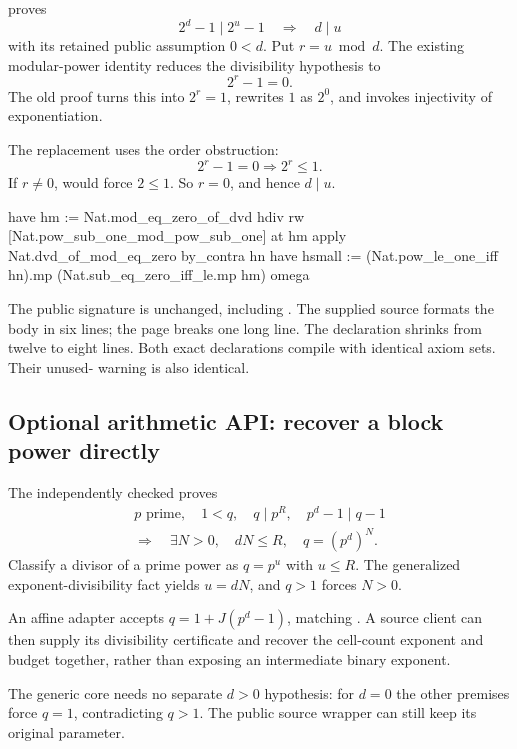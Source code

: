 proves
\[
      2^d-1\mid 2^u-1\quad\Longrightarrow\quad d\mid u
\]
with its retained public assumption $0<d$. Put $r=u\bmod d$. The existing
modular-power identity reduces the divisibility hypothesis to
\[
      2^r-1=0.
\]
The old proof turns this into $2^r=1$, rewrites $1$ as $2^0$, and invokes
injectivity of exponentiation.

The replacement uses the order obstruction:
\[
      2^r-1=0\Longrightarrow 2^r\le1.
\]
If $r\ne0$,  would force $2\le1$.
So $r=0$, and hence $d\mid u$.

\begin{Lean}
  have hm := Nat.mod_eq_zero_of_dvd hdiv
  rw [Nat.pow_sub_one_mod_pow_sub_one] at hm
  apply Nat.dvd_of_mod_eq_zero
  by_contra hn
  have hsmall :=
    (Nat.pow_le_one_iff hn).mp (Nat.sub_eq_zero_iff_le.mp hm)
  omega
\end{Lean}

The public signature is unchanged, including . The supplied source
formats the body in six lines; the page breaks one long line.
The declaration shrinks from twelve to eight lines. Both exact declarations
compile with identical axiom sets. Their unused- warning is also
identical.

\subsection{Optional arithmetic API: recover a block power directly}

The independently checked  proves
\[
\begin{gathered}
 p\text{ prime},\quad 1<q,\quad q\mid p^R,\quad p^d-1\mid q-1\\
 \Longrightarrow\quad
 \exists N>0,\quad dN\le R,\quad q=(p^d)^N .
\end{gathered}
\tag{7}
\]
Classify a divisor of a prime power as $q=p^u$ with $u\le R$.
The generalized exponent-divisibility fact yields $u=dN$, and $q>1$
forces $N>0$.

An affine adapter accepts $q=1+J(p^d-1)$, matching .
A source client can then supply its divisibility certificate and recover
the cell-count exponent and budget together, rather than exposing an
intermediate binary exponent.

The generic core needs no separate $d>0$ hypothesis: for $d=0$ the other
premises force $q=1$, contradicting $q>1$. The public source wrapper can
still keep its original parameter.

